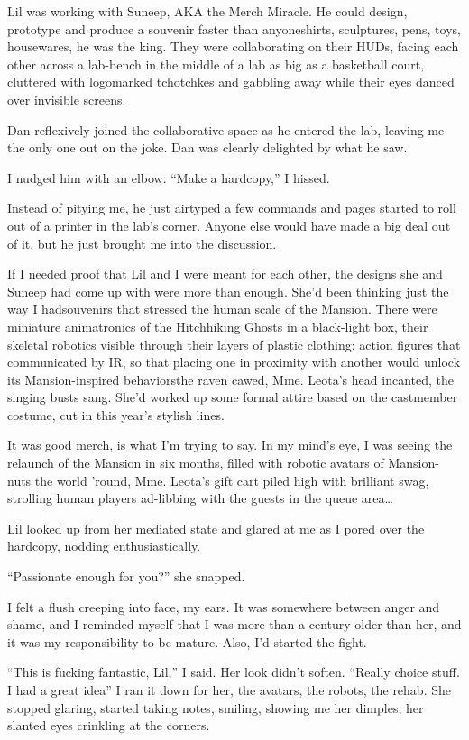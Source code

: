 Lil was working with Suneep, AKA the Merch Miracle. He could
design, prototype and produce a souvenir faster than anyone{\dash}shirts,
sculptures, pens, toys, housewares, he was the king. They were
collaborating on their HUDs, facing each other across a lab-bench
in the middle of a lab as big as a basketball court, cluttered with
logomarked tchotchkes and gabbling away while their eyes danced
over invisible screens.

Dan reflexively joined the collaborative space as he entered the
lab, leaving me the only one out on the joke. Dan was clearly
delighted by what he saw.

I nudged him with an elbow. “Make a hardcopy,” I hissed.

Instead of pitying me, he just airtyped a few commands and pages
started to roll out of a printer in the lab's corner. Anyone else
would have made a big deal out of it, but he just brought me into
the discussion.

If I needed proof that Lil and I were meant for each other, the
designs she and Suneep had come up with were more than enough.
She'd been thinking just the way I had{\dash}sou\-ven\-irs that stressed the
human scale of the Mansion. There were miniature animatronics of
the Hitchhiking Ghosts in a black-light box, their skeletal
robotics visible through their layers of plastic clothing; action
figures that communicated by IR, so that placing one in proximity
with another would unlock its Mansion-inspired behaviors{\dash}the raven
cawed, Mme. Leota's head incanted, the singing busts sang. She'd
worked up some formal attire based on the castmember costume, cut
in this year's stylish lines.

It was good merch, is what I'm trying to say. In my mind's eye, I
was seeing the relaunch of the Mansion in six months, filled with
robotic avatars of Mansion-nuts the world 'round, Mme. Leota's gift
cart piled high with brilliant swag, strolling human players
ad-libbing with the guests in the queue area…

Lil looked up from her mediated state and glared at me as I pored
over the hardcopy, nodding enthusiastically.

“Passionate enough for you?” she snapped.

I felt a flush creeping into face, my ears. It was somewhere
between anger and shame, and I reminded myself that I was more than
a century older than her, and it was my responsibility to be
mature. Also, I'd started the fight.

“This is fucking fantastic, Lil,” I said. Her look didn't soften.
“Really choice stuff. I had a great idea{\dash}” I ran it down for her,
the avatars, the robots, the rehab. She stopped glaring, started
taking notes, smiling, showing me her dimples, her slanted eyes
crinkling at the corners.

